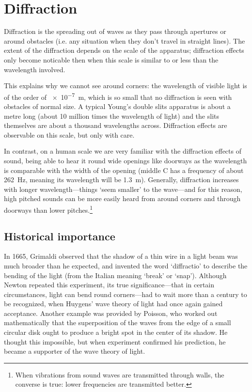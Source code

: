 
\section{Diffraction}

Diffraction is the spreading out of waves as they pass through apertures or around obstacles (i.e. any situation when they don't travel in straight lines).  The extent of the diffraction depends on the scale of the apparatus; diffraction effects only become noticable then when this scale is similar to or less than the wavelength involved.

This explains why we cannot see around corners: the wavelength of visible light is of the order of \SI{e-7}{m}, which is so small that no diffraction is seen with obstacles of normal size.  A typical Young's double slits apparatus is about a metre long (about 10 million times the wavelength of light) and the slits themselves are about a thousand wavelengths across.  Diffraction effects are observable on this scale, but only with care.

In contrast, on a human scale we are very familiar with the diffraction effects of sound, being able to hear it round wide openings like doorways as the wavelength is comparable with the width of the opening (middle C has a frequency of about \SI{262}{Hz}, meaning its wavelength will be \SI{1.3}{m}).  Generally, diffraction increases with longer wavelength---things `seem smaller' to the wave---and for this reason, high pitched sounds can be more easily heard from around corners and through doorways than lower pitches.\footnote{When vibrations from sound waves are transmitted through walls, the converse is true: lower frequencies are transmitted better.}

\subsection{Historical importance}

In 1665, Grimaldi observed that the shadow of a thin wire in a light beam was much broader than he expected, and invented the word `diffractio' to describe the bending of the light (from the Italian meaning `break' or `snap').  Although Newton repeated this experiment, its true significance---that in certain circumstances, light can bend round corners---had to wait more than a century to be recognized, when Huygens' wave theory of light had once again gained acceptance.  Another example was provided by Poisson, who worked out mathematically that the superposition of the waves from the edge of a small circular disk ought to produce a bright spot in the center of its shadow.  He thought this impossible, but when experiment confirmed his prediction, he became a supporter of the wave theory of light.

